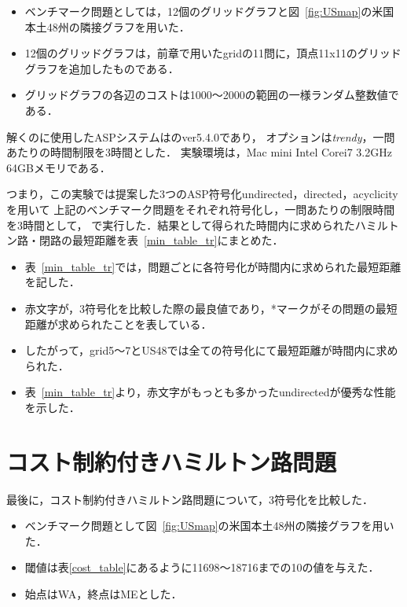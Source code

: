 \begin{itemize}
\item ベンチマーク問題としては，12個のグリッドグラフと図~\ref{fig:USmap}の米国本土48州の隣接グラフを用いた．
\item 12個のグリッドグラフは，前章で用いたgridの11問に，頂点11x11のグリッドグラフを追加したものである．
\item グリッドグラフの各辺のコストは1000〜2000の範囲の一様ランダム整数値である．
\end{itemize}

解くのに使用したASPシステムは{\clingo}のver5.4.0であり，
オプションは\textit{trendy}，一問あたりの時間制限を3時間とした．
実験環境は，Mac mini Intel Corei7 3.2GHz 64GBメモリである．

つまり，この実験では提案した3つのASP符号化\textsf{undirected}，\textsf{directed}，\textsf{acyclicity}を用いて
上記のベンチマーク問題をそれぞれ符号化し，一問あたりの制限時間を3時間として，
{\clingo}で実行した．結果として得られた時間内に求められたハミルトン路・閉路の最短距離を表~\ref{min_table_tr}にまとめた．

\begin{itemize}
\item 表~\ref{min_table_tr}では，問題ごとに各符号化が時間内に求められた最短距離を記した．
\item 赤文字が，3符号化を比較した際の最良値であり，*マークがその問題の最短距離が求められたことを表している．
\item したがって，grid5〜7とUS48では全ての符号化にて最短距離が時間内に求められた．
\item 表~\ref{min_table_tr}より，赤文字がもっとも多かった\textsf{undirected}が優秀な性能を示した．
\end{itemize}

\section{コスト制約付きハミルトン路問題}


最後に，コスト制約付きハミルトン路問題について，3符号化を比較した．

\begin{itemize}
\item ベンチマーク問題として図~\ref{fig:USmap}の米国本土48州の隣接グラフを用いた．
\item 閾値は表\ref{cost_table}にあるように11698〜18716までの10の値を与えた．
\item 始点はWA，終点はMEとした．
\end{itemize}

